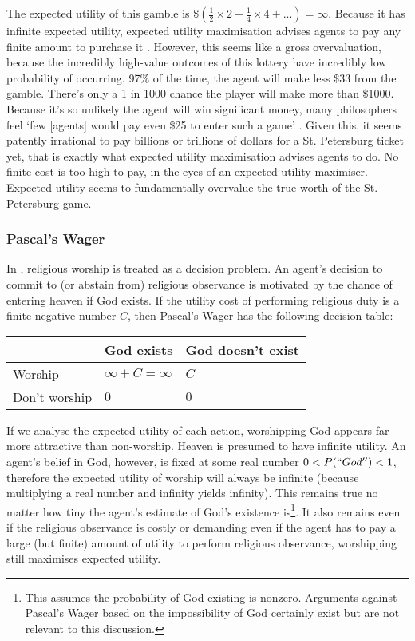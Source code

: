 \documentclass{article}
\begin{document}
The expected utility of this gamble is \$\((\frac{1}{2}\times2 + \frac{1}{4}\times4+...) = \infty\). Because it has infinite expected utility, expected utility maximisation advises agents to pay any finite amount to purchase it \citep{resnik1987choices}. However, this seems like a gross overvaluation, because the incredibly high-value outcomes of this lottery have incredibly low probability of occurring. 97\% of the time, the agent will make less \$33 from the gamble. There's only a 1 in 1000 chance the player will make more than \$1000. Because it's so unlikely the agent will win significant money, many philosophers feel `few [agents] would pay even \$25 to enter such a game' \citep{hacking1980strange}. Given this, it seems patently irrational to pay billions or trillions of dollars for a St. Petersburg ticket \textemdash{} yet, that is exactly what expected utility maximisation advises agents to do. No finite cost is too high to pay, in the eyes of an expected utility maximiser. Expected utility seems to fundamentally overvalue the true worth of the St. Petersburg game.

\subsubsection {Pascal's Wager}

In \citep{pascal1852pensees}, religious worship is treated as a decision problem. An agent's decision to commit to (or abstain from) religious observance is motivated by the chance of entering heaven if God exists. If the utility cost of performing religious duty is a finite negative number \(C\), then Pascal's Wager has the following decision table:

\begin{center}
\begin{tabular}{ | l | l | l |}
  \hline
    & God exists & God doesn't exist \\ \hline
  Worship & \(\infty+C=\infty\) & \(C\) \\ \hline
  Don't worship & \(0\)  & \(0\) \\
  \hline
\end{tabular}
\end{center}

If we analyse the expected utility of each action, worshipping God appears far more attractive than non-worship. Heaven is presumed to have infinite utility. An agent's belief in God, however, is fixed at some real number \(0<P(``God'')<1\), therefore the expected utility of worship will always be infinite (because multiplying a real number and infinity yields infinity). This remains true no matter how tiny the agent's estimate of God's existence is\footnote{This assumes the probability of God existing is nonzero. Arguments against Pascal's Wager based on the impossibility of God certainly exist \citep{oppy1991rescher} but are not relevant to this discussion.}. It also remains even if the religious observance is costly or demanding \textemdash{} even if the agent has to pay a large (but finite) amount of utility to perform religious observance, worshipping still maximises expected utility.
\end{document}
